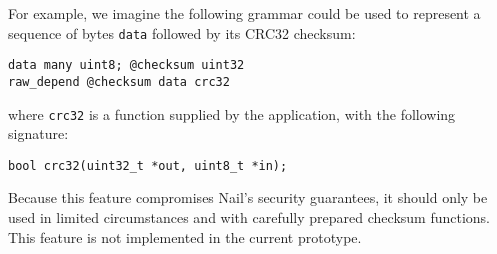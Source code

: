 For example, we imagine the following grammar could be used to represent
a sequence of bytes \texttt{data} followed by its CRC32 checksum:

\begin{verbatim}
data many uint8; @checksum uint32
raw_depend @checksum data crc32
\end{verbatim}

\noindent
where \texttt{crc32} is a function supplied by the application, with
the following signature:

\begin{verbatim}
bool crc32(uint32_t *out, uint8_t *in);
\end{verbatim}

Because this feature compromises Nail's security guarantees, it should
only be used in limited circumstances and with carefully prepared checksum
functions.  This feature is not implemented in the current prototype.

